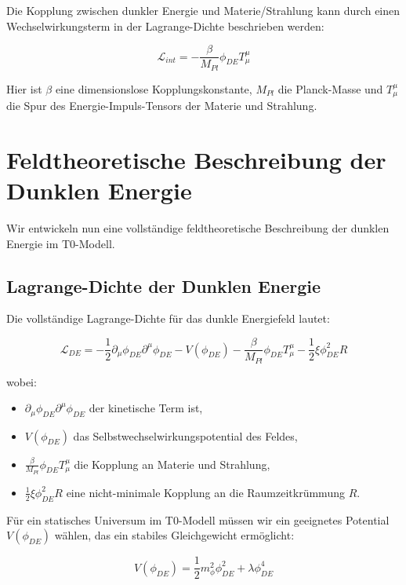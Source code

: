 \documentclass[a4paper,12pt]{article}
\theoremstyle{definition}
\theoremstyle{remark}
\begin{document}
	Die Kopplung zwischen dunkler Energie und Materie/Strahlung kann durch einen Wechselwirkungsterm in der Lagrange-Dichte beschrieben werden:
	
	\begin{equation}
		\mathcal{L}_{int} = -\frac{\beta}{M_{Pl}} \phi_{DE} T^{\mu}_{\mu}
	\end{equation}
	
	Hier ist $\beta$ eine dimensionslose Kopplungskonstante, $M_{Pl}$ die Planck-Masse und $T^{\mu}_{\mu}$ die Spur des Energie-Impuls-Tensors der Materie und Strahlung.
	
	\section{Feldtheoretische Beschreibung der Dunklen Energie}
	Wir entwickeln nun eine vollständige feldtheoretische Beschreibung der dunklen Energie im T0-Modell.
	
	\subsection{Lagrange-Dichte der Dunklen Energie}
	Die vollständige Lagrange-Dichte für das dunkle Energiefeld lautet:
	
	\begin{equation}
		\mathcal{L}_{DE} = -\frac{1}{2}\partial_\mu \phi_{DE} \partial^\mu \phi_{DE} - V(\phi_{DE}) - \frac{\beta}{M_{Pl}} \phi_{DE} T^{\mu}_{\mu} - \frac{1}{2}\xi \phi_{DE}^2 R
	\end{equation}
	
	wobei:
	\begin{itemize}
		\item $\partial_\mu \phi_{DE} \partial^\mu \phi_{DE}$ der kinetische Term ist,
		\item $V(\phi_{DE})$ das Selbstwechselwirkungspotential des Feldes,
		\item $\frac{\beta}{M_{Pl}} \phi_{DE} T^{\mu}_{\mu}$ die Kopplung an Materie und Strahlung,
		\item $\frac{1}{2}\xi \phi_{DE}^2 R$ eine nicht-minimale Kopplung an die Raumzeitkrümmung $R$.
	\end{itemize}
	
	Für ein statisches Universum im T0-Modell müssen wir ein geeignetes Potential $V(\phi_{DE})$ wählen, das ein stabiles Gleichgewicht ermöglicht:
	
	\begin{equation}
		V(\phi_{DE}) = \frac{1}{2}m_{\phi}^2\phi_{DE}^2 + \lambda \phi_{DE}^4
	\end{equation}
	
\end{document}
